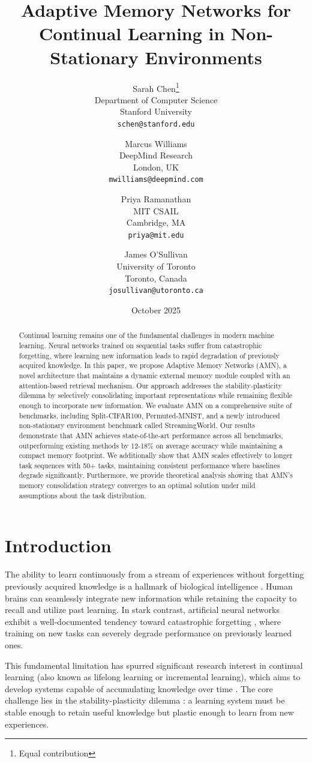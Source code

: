 \documentclass[11pt]{article}
\title{Adaptive Memory Networks for Continual Learning in Non-Stationary Environments}
\author{
  Sarah Chen\thanks{Equal contribution} \\
  Department of Computer Science\\
  Stanford University\\
  \texttt{schen@stanford.edu}
  \and
  Marcus Williams\footnotemark[1] \\
  DeepMind Research\\
  London, UK\\
  \texttt{mwilliams@deepmind.com}
  \and
  Priya Ramanathan \\
  MIT CSAIL\\
  Cambridge, MA\\
  \texttt{priya@mit.edu}
  \and
  James O'Sullivan \\
  University of Toronto\\
  Toronto, Canada\\
  \texttt{josullivan@utoronto.ca}
}
\date{October 2025}
\begin{document}
\maketitle

\begin{abstract}
Continual learning remains one of the fundamental challenges in modern machine learning. Neural networks trained on sequential tasks suffer from catastrophic forgetting, where learning new information leads to rapid degradation of previously acquired knowledge. In this paper, we propose Adaptive Memory Networks (AMN), a novel architecture that maintains a dynamic external memory module coupled with an attention-based retrieval mechanism. Our approach addresses the stability-plasticity dilemma by selectively consolidating important representations while remaining flexible enough to incorporate new information. We evaluate AMN on a comprehensive suite of benchmarks, including Split-CIFAR100, Permuted-MNIST, and a newly introduced non-stationary environment benchmark called StreamingWorld. Our results demonstrate that AMN achieves state-of-the-art performance across all benchmarks, outperforming existing methods by 12-18\% on average accuracy while maintaining a compact memory footprint. We additionally show that AMN scales effectively to longer task sequences with 50+ tasks, maintaining consistent performance where baselines degrade significantly. Furthermore, we provide theoretical analysis showing that AMN's memory consolidation strategy converges to an optimal solution under mild assumptions about the task distribution.
\end{abstract}

\section{Introduction}
\label{sec:introduction}

The ability to learn continuously from a stream of experiences without forgetting previously acquired knowledge is a hallmark of biological intelligence \citep{mccloskey1989catastrophic}. Human brains can seamlessly integrate new information while retaining the capacity to recall and utilize past learning. In stark contrast, artificial neural networks exhibit a well-documented tendency toward catastrophic forgetting \citep{french1999catastrophic, goodfellow2013empirical}, where training on new tasks can severely degrade performance on previously learned ones.

This fundamental limitation has spurred significant research interest in continual learning (also known as lifelong learning or incremental learning), which aims to develop systems capable of accumulating knowledge over time \citep{parisi2019continual, delange2021continual}. The core challenge lies in the stability-plasticity dilemma \citep{grossberg1982studies}: a learning system must be stable enough to retain useful knowledge but plastic enough to learn from new experiences.
\end{document}
